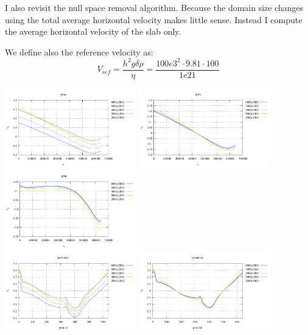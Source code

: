 I also revisit the null space removal algorithm. Because the domain size changes 
using the total average horizontal velocity makes little sense. Instead 
I compute the average horizontal velocity of the slab only. 

We define also the reference velocity as:
\[
V_{ref}= \frac{h^2 g \delta \rho }{\eta} = \frac{100e3^2 \cdot 9.81 \cdot 100}{1e21}
\]

\begin{center}
\includegraphics[width=5.7cm]{python_codes/fieldstone_55/gamma001/vx_spine}
\includegraphics[width=5.7cm]{python_codes/fieldstone_55/gamma001/vx_spine2}
\includegraphics[width=5.7cm]{python_codes/fieldstone_55/gamma001/vy_spine}\\
\includegraphics[width=5.7cm]{python_codes/fieldstone_55/gamma001/vx_perimeter}
\includegraphics[width=5.7cm]{python_codes/fieldstone_55/gamma001/vx_perimeter2}

\end{center}
